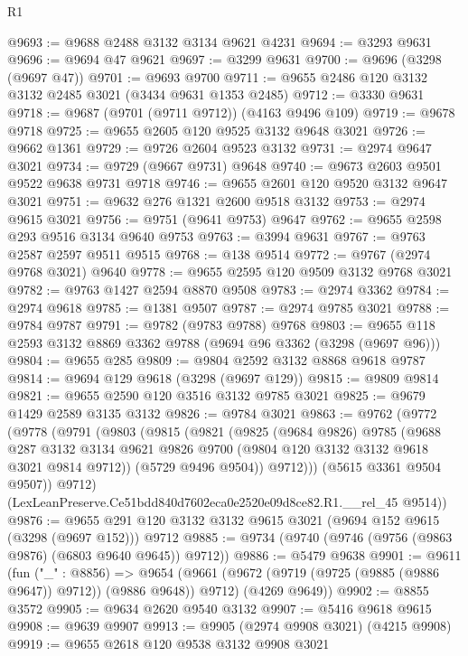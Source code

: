 \begin{lexlean}{R1}
\begin{coremodule}
@9693 := @9688 @2488 @3132 @3134 @9621 @4231
@9694 := @3293 @9631
@9696 := @9694 @47 @9621
@9697 := @3299 @9631
@9700 := @9696 (@3298 (@9697 @47))
@9701 := @9693 @9700
@9711 := @9655 @2486 @120 @3132 @3132 @2485 @3021 (@3434 @9631 @1353 @2485)
@9712 := @3330 @9631
@9718 := @9687 (@9701 (@9711 @9712)) (@4163 @9496 @109)
@9719 := @9678 @9718
@9725 := @9655 @2605 @120 @9525 @3132 @9648 @3021
@9726 := @9662 @1361
@9729 := @9726 @2604 @9523 @3132
@9731 := @2974 @9647 @3021
@9734 := @9729 (@9667 @9731) @9648
@9740 := @9673 @2603 @9501 @9522 @9638 @9731 @9718
@9746 := @9655 @2601 @120 @9520 @3132 @9647 @3021
@9751 := @9632 @276 @1321 @2600 @9518 @3132
@9753 := @2974 @9615 @3021
@9756 := @9751 (@9641 @9753) @9647
@9762 := @9655 @2598 @293 @9516 @3134 @9640 @9753
@9763 := @3994 @9631
@9767 := @9763 @2587 @2597 @9511 @9515
@9768 := @138 @9514
@9772 := @9767 (@2974 @9768 @3021) @9640
@9778 := @9655 @2595 @120 @9509 @3132 @9768 @3021
@9782 := @9763 @1427 @2594 @8870 @9508
@9783 := @2974 @3362
@9784 := @2974 @9618
@9785 := @1381 @9507
@9787 := @2974 @9785 @3021
@9788 := @9784 @9787
@9791 := @9782 (@9783 @9788) @9768
@9803 := @9655 @118 @2593 @3132 @8869 @3362 @9788 (@9694 @96 @3362 (@3298 (@9697 @96)))
@9804 := @9655 @285
@9809 := @9804 @2592 @3132 @8868 @9618 @9787
@9814 := @9694 @129 @9618 (@3298 (@9697 @129))
@9815 := @9809 @9814
@9821 := @9655 @2590 @120 @3516 @3132 @9785 @3021
@9825 := @9679 @1429 @2589 @3135 @3132
@9826 := @9784 @3021
@9863 := @9762
    (@9772
      (@9778
        (@9791
          (@9803
            (@9815
              (@9821
                (@9825
                  (@9684 @9826)
                  @9785
                  (@9688
                    @287
                    @3132
                    @3134
                    @9621
                    @9826
                    @9700
                    (@9804 @120 @3132 @3132 @9618 @3021 @9814 @9712))
                  (@5729 @9496 @9504))
                @9712)))
          (@5615 @3361 @9504 @9507))
        @9712)
      (LexLeanPreserve.Ce51bdd840d7602eca0e2520e09d8ce82.R1.__rel_45 @9514))
@9876 := @9655 @291 @120 @3132 @3132 @9615 @3021 (@9694 @152 @9615 (@3298 (@9697 @152))) @9712
@9885 := @9734 (@9740 (@9746 (@9756 (@9863 @9876) (@6803 @9640 @9645)) @9712))
@9886 := @5479 @9638
@9901 := @9611
    (fun ("_" : @8856) =>
    @9654
      (@9661 (@9672 (@9719 (@9725 (@9885 (@9886 @9647)) @9712)) (@9886 @9648)) @9712)
      (@4269 @9649))
@9902 := @8855 @3572
@9905 := @9634 @2620 @9540 @3132
@9907 := @5416 @9618 @9615
@9908 := @9639 @9907
@9913 := @9905 (@2974 @9908 @3021) (@4215 @9908)
@9919 := @9655 @2618 @120 @9538 @3132 @9908 @3021

\end{coremodule}
\end{lexlean}

